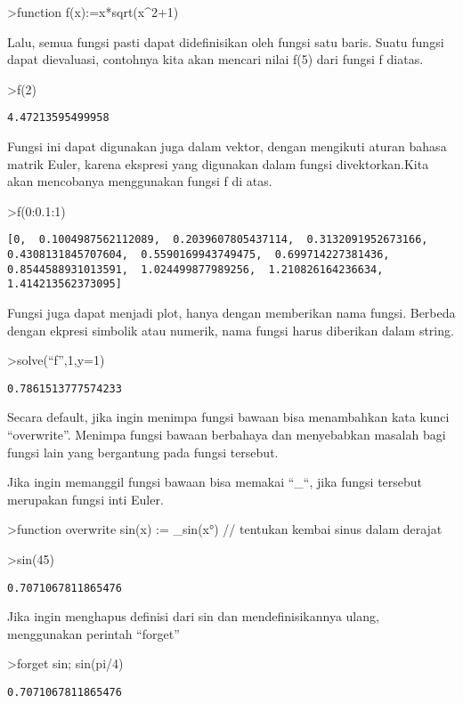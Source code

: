 \documentclass[
]{book}
\begin{document}
\textgreater function f(x):=x*sqrt(x\^{}2+1)

Lalu, semua fungsi pasti dapat didefinisikan oleh fungsi satu baris. Suatu fungsi dapat dievaluasi, contohnya kita akan mencari nilai f(5) dari fungsi f diatas.

\textgreater f(2)

\begin{verbatim}
4.47213595499958
\end{verbatim}

Fungsi ini dapat digunakan juga dalam vektor, dengan mengikuti aturan bahasa matrik Euler, karena ekspresi yang digunakan dalam fungsi divektorkan.Kita akan mencobanya menggunakan fungsi f di atas.

\textgreater f(0:0.1:1)

\begin{verbatim}
[0,  0.1004987562112089,  0.2039607805437114,  0.3132091952673166,
0.4308131845707604,  0.5590169943749475,  0.699714227381436,
0.8544588931013591,  1.024499877989256,  1.210826164236634,
1.414213562373095]
\end{verbatim}

Fungsi juga dapat menjadi plot, hanya dengan memberikan nama fungsi. Berbeda dengan ekpresi simbolik atau numerik, nama fungsi harus diberikan dalam string.

\textgreater solve(``f'',1,y=1)

\begin{verbatim}
0.7861513777574233
\end{verbatim}

Secara default, jika ingin menimpa fungsi bawaan bisa menambahkan kata kunci ``overwrite''. Menimpa fungsi bawaan berbahaya dan menyebabkan masalah bagi fungsi lain yang bergantung pada fungsi tersebut.

Jika ingin memanggil fungsi bawaan bisa memakai ``\_``, jika fungsi tersebut merupakan fungsi inti Euler.

\textgreater function overwrite sin(x) := \_sin(x°) // tentukan kembai sinus dalam derajat

\textgreater sin(45)

\begin{verbatim}
0.7071067811865476
\end{verbatim}

Jika ingin menghapus definisi dari sin dan mendefinisikannya ulang, menggunakan perintah ``forget''

\textgreater forget sin; sin(pi/4)

\begin{verbatim}
0.7071067811865476
\end{verbatim}
\end{document}
